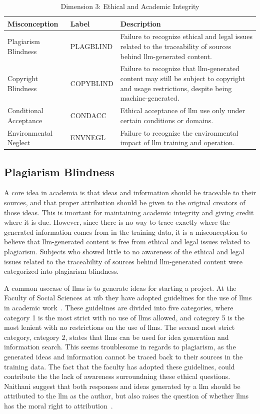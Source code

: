 \begin{table}[htbp]
\centering
\caption{Dimension 3: Ethical and Academic Integrity}\label{dim3}
\begin{tabularx}{\textwidth}{|l|l|X|}
\hline
\textbf{Misconception} & \textbf{Label} & \textbf{Description} \\
\hline
Plagiarism Blindness & PLAGBLIND & Failure to recognize ethical and legal issues related to the traceability of sources behind \gls{llm}-generated content. \\
\hline
Copyright Blindness & COPYBLIND & Failure to recognize that \gls{llm}-generated content may still be subject to copyright and usage restrictions, despite being machine-generated. \\
\hline
Conditional Acceptance & CONDACC & Ethical acceptance of \gls{llm} use only under certain conditions or domains. \\
\hline
Environmental Neglect & ENVNEGL & Failure to recognize the environmental impact of \gls{llm} training and operation. \\
\hline
\end{tabularx}
\end{table}

\subsection{Plagiarism Blindness}\label{plagblind}
A core idea in academia is that ideas and information should be traceable to their sources, and that proper attribution should be given to the original creators of those ideas. This is imortant for maintaining academic integrity and giving credit where it is due. However, since there is no way to trace exactly where the generated information comes from in the training data, it is a misconception to believe that \gls{llm}-generated content is free from ethical and legal issues related to plagiarism. Subjects who showed little to no awareness of the ethical and legal issues related to the traceability of sources behind \gls{llm}-generated content were categorized into plagiarism blindness.

A common usecase of \gls{llms} is to generate ideas for starting a project. At the Faculty of Social Sciences at \gls{uib} they have adopted guidelines for the use of \gls{llms} in academic work\ \cite{uib_ki_retningslinjer_2025}. These guidelines are divided into five categories, where category 1 is the most strict with no use of \gls{llms} allowed, and category 5 is the most lenient with no restrictions on the use of \gls{llms}. The second most strict category, category 2, states that \gls{llms} can be used for idea generation and information search. This seems troublesome in regards to plagiarism, as the generated ideas and information cannot be traced back to their sources in the training data. The fact that the faculty has adopted these guidelines, could contribute the the lack of awareness surroundning these ethical questions. 
Naithani suggest that both responses and ideas generated by a \gls{llm} should be attributed to the \gls{llm} as the author, but also raises the question of whether \gls{llms} has the moral right to attribution\ \cite{naithani_issues_2025}.

